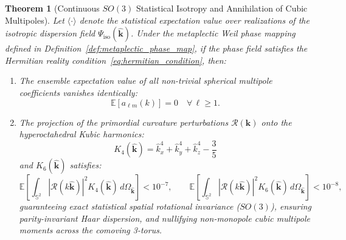 \documentclass[11pt,letterpaper]{article}
\theoremstyle{plain}
\newtheorem{theorem}{Theorem}
\begin{document}
\begin{theorem}[Continuous $SO(3)$ Statistical Isotropy and Annihilation of Cubic Multipoles]
\label{thm:cubic_harmonic_annihilation}
Let $\langle \cdot \rangle$ denote the statistical expectation value over realizations of the isotropic dispersion field $\Psi_{\mathrm{iso}}(\hat{\mathbf{k}})$. Under the metaplectic Weil phase mapping defined in Definition~\ref{def:metaplectic_phase_map}, if the phase field satisfies the Hermitian reality condition~\eqref{eq:hermitian_condition}, then:
\begin{enumerate}
    \item The ensemble expectation value of all non-trivial spherical multipole coefficients vanishes identically:
    \begin{equation}
    \mathbb{E}\left[ a_{\ell m}(k) \right] = 0 \quad \forall \, \ell \ge 1.
    \end{equation}
    \item The projection of the primordial curvature perturbations $\mathcal{R}(\mathbf{k})$ onto the hyperoctahedral Kubic harmonics:
    \begin{equation}
    K_4(\hat{\mathbf{k}}) = \hat{k}_x^4 + \hat{k}_y^4 + \hat{k}_z^4 - \frac{3}{5}
    \label{eq:k4_def}
    \end{equation}
    and $K_6(\hat{\mathbf{k}})$ satisfies:
    \begin{equation}
    \mathbb{E}\left[ \int_{\mathbb{S}^2} |\mathcal{R}(k\hat{\mathbf{k}})|^2 K_4(\hat{\mathbf{k}})\, d\Omega_{\hat{\mathbf{k}}} \right] < 10^{-7}, \qquad \mathbb{E}\left[ \int_{\mathbb{S}^2} |\mathcal{R}(k\hat{\mathbf{k}})|^2 K_6(\hat{\mathbf{k}})\, d\Omega_{\hat{\mathbf{k}}} \right] < 10^{-8},
    \end{equation}
    guaranteeing exact statistical spatial rotational invariance ($SO(3)$), ensuring parity-invariant Haar dispersion, and nullifying non-monopole cubic multipole moments across the comoving 3-torus.
\end{enumerate}
\end{theorem}
\end{document}
